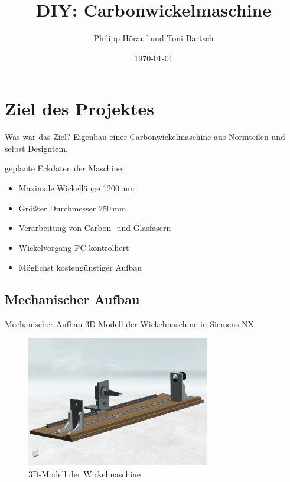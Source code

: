 \documentclass[12pt]{beamer}
\author{Philipp Hörauf und Toni Bartsch}
\title{DIY: Carbonwickelmaschine}
\date{\today}
\begin{document}
\begin{frame}
\titlepage
\end{frame}


\begin{frame}
\tableofcontents
\end{frame}

\section{Ziel des Projektes}
\begin{frame}{Was war das Ziel?}
Eigenbau einer Carbonwickelmaschine aus Normteilen und selbst Designtem.\newline
\vspace{0.5cm}


geplante Eckdaten der Maschine:
\begin{itemize}
	\item Maximale Wickellänge 1200\,mm
	\item Größter Durchmesser 250\,mm
	\item Verarbeitung von Carbon- und Glasfasern
	\item Wickelvorgang PC-kontrolliert
	\item Möglichst kostengünstiger Aufbau
\end{itemize}

\end{frame}

\subsection{Mechanischer Aufbau}
\begin{frame}{Mechanischer Aufbau}
3D Modell der Wickelmaschine in Siemens NX
\begin{figure}
	\includegraphics[width=8cm]{NX_Screenshots/gesamt3.png}
	\caption{3D-Modell der Wickelmaschine}
\end{figure}
\end{frame}
\end{document}
